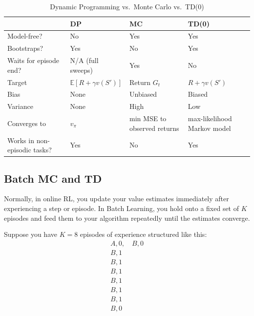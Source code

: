 \begin{table}[h]
    \centering
    \caption{Dynamic Programming vs.\ Monte Carlo vs.\ TD(0)}
    \begin{tabularx}{\linewidth}{l X X X}
    \toprule
     & \textbf{DP} & \textbf{MC} & \textbf{TD(0)} \\
    \midrule
    Model-free? & No & Yes & Yes \\
    Bootstraps? & Yes & No & Yes \\
    Waits for episode end? & N/A (full sweeps) & Yes & No \\
    Target & $\mathbb{E}[R + \gamma v(S')]$ & Return $G_t$ & $R + \gamma v(S')$ \\
    Bias & None & Unbiased & Biased \\
    Variance & None & High & Low \\
    Converges to & $v_\pi$ & min MSE to observed returns & max-likelihood Markov model \\
    Works in non-episodic tasks? & Yes & No & Yes \\
    \bottomrule
    \end{tabularx}
\end{table}


\subsection{Batch MC and TD}
Normally, in online RL, you update your value estimates immediately after experiencing a step or episode. In Batch Learning, you hold onto a fixed set of $K$ episodes and feed them to your algorithm repeatedly until the estimates converge.

Suppose you have $K=8$ episodes of experience structured like this:
\begin{align*}
    A,0, \quad B,0 \\
    B,1 \\
    B,1 \\    
    B,1 \\
    B,1 \\
    B,1 \\
    B,1 \\
    B,0
\end{align*}

